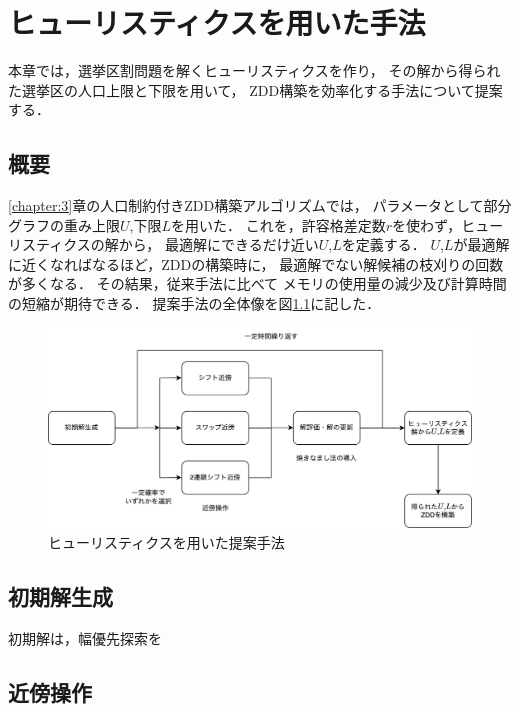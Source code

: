 \chapter{ヒューリスティクスを用いた手法} \label{chapter:4}

本章では，選挙区割問題を解くヒューリスティクスを作り，
その解から得られた選挙区の人口上限と下限を用いて，
ZDD構築を効率化する手法について提案する．

\section{概要}

\ref{chapter:3}章の人口制約付きZDD構築アルゴリズムでは，
パラメータとして部分グラフの重み上限$U$,下限$L$を用いた．
これを，許容格差定数$r$を使わず，ヒューリスティクスの解から，
最適解にできるだけ近い$U$,$L$を定義する．
$U$,$L$が最適解に近くなればなるほど，ZDDの構築時に，
最適解でない解候補の枝刈りの回数が多くなる．
その結果，従来手法に比べて
メモリの使用量の減少及び計算時間の短縮が期待できる．
提案手法の全体像を図\ref{heuristics}に記した．

\begin{figure}[htbp]
  \centering
  \includegraphics[scale=0.39]{img/heuristics.png}
  \caption{ヒューリスティクスを用いた提案手法}
  \label{heuristics}
\end{figure}



\section{初期解生成}

初期解は，幅優先探索を

\section{近傍操作}

